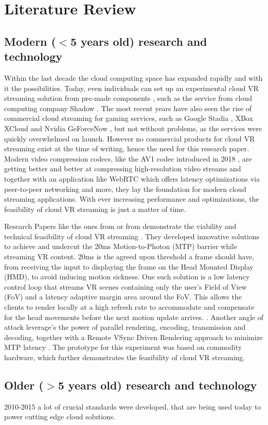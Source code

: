 \section{Literature Review}
\subsection{Modern ($<$5 years old) research and technology}

Within the last decade the cloud computing space has expanded rapidly and with it the possibilities. Today, even individuals can set up an experimental cloud VR streaming solution from pre-made components \parencite{tayoexe}, such as the service from cloud computing company Shadow \parencite{shadow}. The most recent years have also seen the rise of commercial cloud streaming for gaming services, such as Google Stadia \parencite{stadia}, XBox XCloud \parencite{xcloud} and Nvidia GeForceNow \parencite{geforcenow}, but not without problems, as the services were quickly overwhelmed on launch. However no commercial products for cloud VR streaming exist at the time of writing, hence the need for this research paper. Modern video compression codecs, like the AV1 codec introduced in 2018 \parencite{av1}, are getting better and better at compressing high-resolution video streams and together with an application like WebRTC \parencite{webRTC} which offers latency optimizations via peer-to-peer networking and more, they lay the foundation for modern cloud streaming applications. With ever increasing performance and optimizations, the feasibility of cloud VR streaming is just a matter of time.

Research Papers like the ones from \cite{cutcord} or from \cite{mvr} demonstrate the viability and technical feasibility of cloud VR streaming . They developed innovative solutions to achieve and undercut the 20ms Motion-to-Photon (MTP) barrier while streaming VR content. 20ms is the agreed upon threshold a frame should have, from receiving the input to displaying the frame on the Head Mounted Display (HMD), to avoid inducing motion sickness. One such solution is a low latency control loop that streams VR scenes containing only the user’s Field of View (FoV) and a latency adaptive margin area around the FoV. This allows the clients to render locally at a high refresh rate to accommodate and compensate for the head movements before the next motion update arrives. \parencite{mvr}. Another angle of attack  leverage's the power of parallel rendering, encoding, transmission and decoding, together with a Remote VSync Driven Rendering approach to minimize MTP latency \parencite{cutcord}. The prototype for this experiment was based on commodity hardware, which further demonstrates the feasibility of cloud VR streaming.

\subsection{Older ($>$5 years old) research and technology} 

2010-2015 a lot of crucial standards were developed, that are being used today to power cutting edge cloud solutions. 